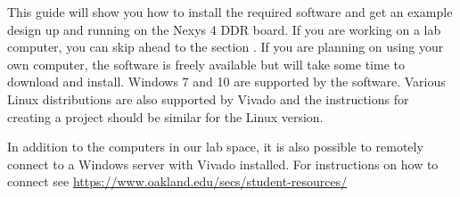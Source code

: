 \documentclass[letterpaper]{article}
\begin{document}
This guide will show you how to install the required software and get an example design up and
running on the Nexys 4 DDR board.
If you are working on a lab computer, you can skip ahead to the section
.
If you are planning on using your own computer, the software is freely available but will take some
time to download and install.
Windows 7 and 10 are supported by the software.
Various Linux distributions are also supported by Vivado and the instructions for creating a
project should be similar for the Linux version.

In addition to the computers in our lab space, it is also possible to remotely connect to a Windows
server with Vivado installed. For instructions on how to connect see
\url{https://www.oakland.edu/secs/student-resources/}




\end{document}
